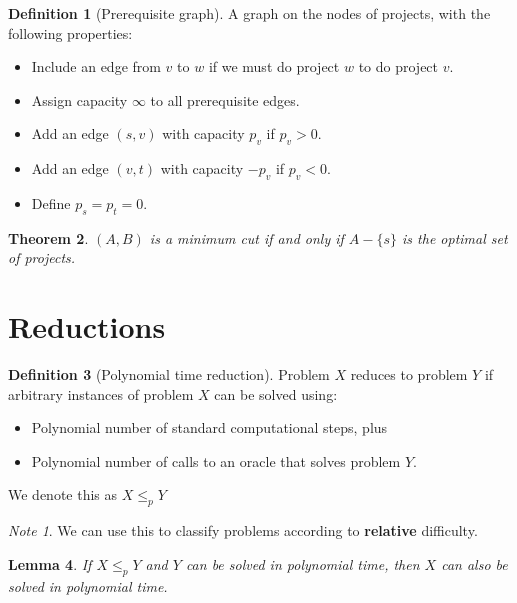 \documentclass[10pt, oneside, reqno]{amsart}
\theoremstyle{plain}%
\newtheorem{thm}{Theorem}[section]
\newtheorem{lem}[thm]{Lemma}
\theoremstyle{definition}
\newtheorem{defn}[thm]{Definition}
\theoremstyle{remark}
\newtheorem*{note}{Note}
\begin{document}
\begin{defn}[Prerequisite graph]
 	A graph on the nodes of projects, with the following properties:
\begin{itemize}
	\item Include an edge from $v$ to $w$ if we must do project $w$ to do project $v$.  
	\item Assign capacity $\infty$ to all prerequisite edges.
	\item Add an edge $(s,v)$ with capacity $p_v$ if $p_v > 0$.
	\item Add an edge $(v,t)$ with capacity $-p_v$ if $p_v < 0$.
	\item Define $p_s = p_t = 0$.  
\end{itemize}
\end{defn}

\begin{thm}
	$(A,B)$ is a minimum cut if and only if $A - \{s\}$ is the optimal set of projects.
\end{thm}






\section{Reductions} %
\label{sec:reductions}
\begin{defn}[Polynomial time reduction]
	Problem $X$ reduces to problem $Y$ if arbitrary instances of problem $X$ can be solved using:
	\begin{itemize}
		\item Polynomial number of standard computational steps, plus
		\item Polynomial number of calls to an oracle that solves problem $Y$.
	\end{itemize}
	
	We denote this as $X \leq_p Y$
\end{defn}

\begin{note}
	We can use this to classify problems according to \textbf{relative} difficulty.  
\end{note}

\begin{lem}
	If $X \leq_p Y$ and $Y$ can be solved in polynomial time, then $X$ can also be solved in polynomial time.
\end{lem}
\end{document}
